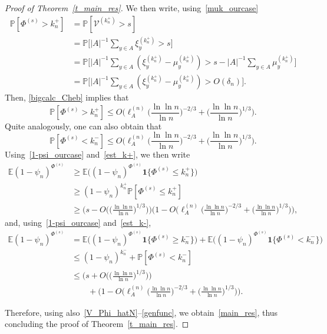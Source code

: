 \documentclass[AHL,Unicode,longabstracts]{cedram}
\newcommand{\1}[1]{{\mathbf 1}{\{#1\}}}
\newcommand{\V}{{\mathcal V}}
\newcommand{\8}{{\infty}}
\newcommand{\IP}{{\mathbb P}}
\newcommand{\IE}{{\mathbb E}}
\begin{document}
\begin{proof}[Proof of Theorem~\ref{t_main_res}]
We then write, using~\eqref{muk_ourcase}
\begin{align}
\IP[\Phi^{(s)} > k_n^{+}] &= \IP[\V^{(k_n^{+})}>s]\nonumber\\
&= \IP\Big[|A|^{-1}\sum_{y\in A}\xi_y^{(k_n^{+})}> s\Big]\nonumber\\
&= \IP\Big[|A|^{-1}\sum_{y\in A}(\xi_y^{(k_n^{+})} -\mu_y^{(k_n^{+})})> s - |A|^{-1}\sum_{y\in A}\mu_y^{(k_n^{+})}\Big]\nonumber\\
&= \IP\Big[|A|^{-1}\sum_{y\in A}(\xi_y^{(k_n^{+})} -\mu_y^{(k_n^{+})})> O(\delta_n)
\Big].\label{Cheb+}
\end{align}
Then, \eqref{bigcalc_Cheb} implies that
\begin{equation}\label{est_k+}
\IP[\Phi^{(s)} > k_n^{+}]
\leq O\Big(\ell^{(n)}_A\Big(\frac{\ln\ln n}{\ln n}\Big)^{-2/3} + \Big(\frac{\ln\ln n}{\ln n}\Big)^{1/3} \Big).
\end{equation}
Quite analogously, one can also obtain that
\begin{equation}\label{est_k-}
\IP[\Phi^{(s)} < k_n^{-}]
\leq O\Big(\ell^{(n)}_A\Big(\frac{\ln\ln n}{\ln n}\Big)^{-2/3} + \Big(\frac{\ln\ln n}{\ln n}\Big)^{1/3} \Big).
\end{equation}
Using~\eqref{1-psi_ourcase} and~\eqref{est_k+}, we then write
\begin{align}
\IE (1-\psi_n)^{\Phi^{(s)}} &\geq
\IE \big((1-\psi_n)^{\Phi^{(s)}}\1{\Phi^{(s)} \leq k_n^{+}}\big)
\nonumber\\
&\geq (1-\psi_n)^{k_n^{+}}
\IP[\Phi^{(s)} \leq k_n^{+}]\nonumber\\
&\geq \Big(s-O\Big(\Big(\frac{\ln\ln n}{\ln n}\Big)^{1/3}\Big)\Big)
\Big(1-O\Big(\ell^{(n)}_A\Big(\frac{\ln\ln n}{\ln n}\Big)^{-2/3} + \Big(\frac{\ln\ln n}{\ln n}\Big)^{1/3} \Big)\Big),\label{bigest>}
\end{align}
and, using~\eqref{1-psi_ourcase} and~\eqref{est_k-},
\begin{align}
\IE (1-\psi_n)^{\Phi^{(s)}} &=
\IE \big((1-\psi_n)^{\Phi^{(s)}}\1{\Phi^{(s)} \geq k_n^{-}}\big) + \IE \big((1-\psi_n)^{\Phi^{(s)}}\1{\Phi^{(s)} < k_n^{-}}\big)
\nonumber\\
&\leq (1-\psi_n)^{k_n^{-}} + \IP[\Phi^{(s)} < k_n^{-}]
\nonumber\\
&\leq \Big(s+O\Big(\Big(\frac{\ln\ln n}{\ln n}\Big)^{1/3}\Big)\Big)
\nonumber\\
& \qquad +
\Big(1-O\Big(\ell^{(n)}_A\Big(\frac{\ln\ln n}{\ln n}\Big)^{-2/3} + \Big(\frac{\ln\ln n}{\ln n}\Big)^{1/3} \Big)\Big).\label{bigest<}
\end{align}


Therefore, using also~\eqref{V_Phi_hatN}--\eqref{genfunc}, we obtain~\eqref{main_res}, thus concluding the proof of Theorem~\ref{t_main_res}.
\end{proof}
\end{document}
